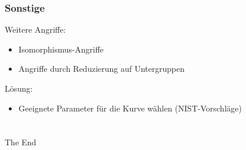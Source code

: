 \documentclass{beamer}
\theoremstyle{plain}
\theoremstyle{definition}
\theoremstyle{rem}
\begin{document}
\begin{frame}
    \frametitle{Sonstige}
    Weitere Angriffe:
    \begin{itemize}
        \item Isomorphismus-Angriffe
        \item Angriffe durch Reduzierung auf Untergruppen
    \end{itemize}
    \pause
    Lösung:
    \begin{itemize}
        \item Geeignete Parameter für die Kurve wählen (NIST-Vorschläge)
    \end{itemize}
\end{frame}

\section*{}

\begin{frame}
    \Huge{\centerline{The End}}
    \vfill
    \pause
\end{frame}

\end{document}
